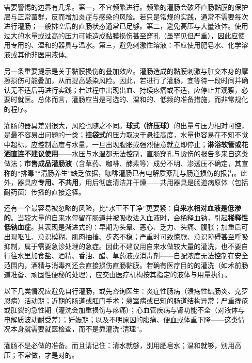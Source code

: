 \documentclass[12pt,UTF8]{ctexbook}
\newcommand{\keyword}[1]{\textbf{#1}}
\begin{document}
需要警惕的边界有几条。第一，不宜频繁进行。频繁的灌肠会破坏直肠黏膜的保护层与正常菌群，反而增加炎症与感染的风险。若只是常规的实践，通常不需要每次进行灌肠；一般排空后的直肠状态通常已足够。第二，避免高压与大量液体。使用过大的水量或过高的压力可能造成黏膜损伤甚至穿孔（虽罕见但严重），因此应使用专用的、温和的器具与温水。第三，避免刺激性溶液：不应使用肥皂水、化学溶液或其他非医用液体。

另一条重要提示是关于黏膜损伤的叠加效应。灌肠造成的黏膜刺激与肛交本身的摩擦损伤可能叠加，从而提高感染风险。因此，若进行了灌肠，宜等待一段时间并确认无不适后再进行实践；若过程中出现出血、持续疼痛或不适，应停止并观察，必要时就医。总体而言，灌肠应当是可选的、温和的、低频的准备措施，而非常规化的程序。

灌肠的器具差别很大，风险也随之不同。\keyword{球式（挤压球）}的出量与压力相对可控，是最不容易出问题的一类；\keyword{挂袋式}的压力取决于悬挂高度，水量也容易在不知不觉中超标，应控制高度与水量，一旦出现腹胀或强烈便意就立即停止；\keyword{淋浴软管或花洒直连不建议使用}——水压与水温都无法控制，直肠穿孔与烫伤的报告多来自这类做法；\keyword{市售成品灌肠液}（含草药、咖啡、酵素等）成分不明、渗透压不确定，其宣称的“排毒”“清肠养生”缺乏依据，咖啡灌肠已有电解质紊乱与肠道损伤的报告。此外，器具应\keyword{专用、不共用}，用后彻底清洁并干燥——共用器具是肠道病原体（包括耐药菌）传播的直接途径。

还有一个最容易被忽略的风险，比“水干不干净”更要紧：\keyword{自来水相对血液是低渗的}。当较大量的自来水停留在肠道并被吸收进入血液时，会稀释血钠，引起\keyword{稀释性低钠血症}。其表现是渐进式的：早期为头晕、恶心、乏力、头痛、腹胀；加重后可出现呕吐、意识模糊、肌肉抽搐、步态不稳；严重时可致惊厥、意识障碍甚至呼吸抑制，属于需要急诊处理的急症。因此不建议用自来水做较大量的灌洗，也不要自行往水里加食盐、酒精、香油、醋、草药液或消毒剂——自配浓度无法控制在安全范围内，酒精与消毒剂还会直接损伤直肠黏膜。若确有医疗目的的灌洗（如术前肠道准备、顽固性便秘的处理），应交由医疗机构按其指定的液体与用量执行。

以下几类情况应避免自行灌肠，或先咨询医生：炎症性肠病（溃疡性结肠炎、克罗恩病）活动期；近期的肠道或肛门手术；憩室病或已知的肠道结构异常；严重痔疮或肛裂的急性期（灌洗会加重损伤与疼痛）；心血管疾病与肾功能不全（对液体与电解质波动耐受差）；妊娠期；以及不明原因的腹痛、便血或体重下降——这类情况本身就需要就医检查，而不是靠灌洗“清理”。

\begin{tcolorbox}[colback=pink!5!white,colframe=red!50!black,title=贴心小叮咛]
灌肠不是必做的准备。而且请记住：清水就够，别用肥皂水；温和就够，别用高压；不常做，才是对的。
\end{tcolorbox}
\end{document}
